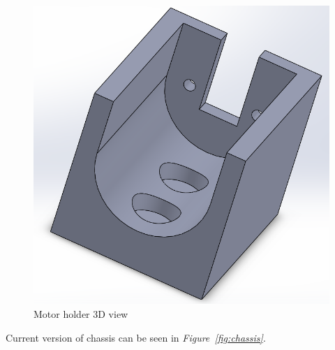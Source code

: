 \documentclass[a4paper,12pt]{article}
\begin{document}
\begin{enumerate}


	\begin{figure}[h]
		\includegraphics[width=.2\textheight,center]{images/motor-holder.png}
	\caption{Motor holder 3D view}
	\end{figure}


	Current version of chassis can be seen in \textit{Figure~\ref{fig:chassis}}.



\end{enumerate}
\end{document}
